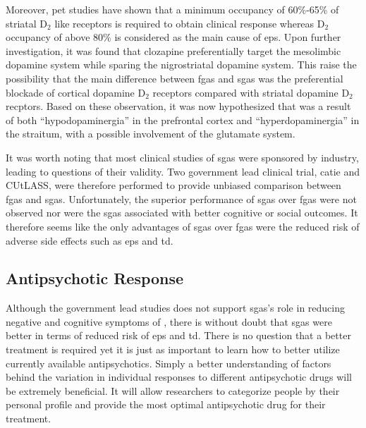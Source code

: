 	Moreover, \gls{pet} studies have shown that a minimum occupancy of 60\%-65\% of striatal D$_2$ like receptors is required to obtain clinical response whereas D$_2$ occupancy of above 80\% is considered as the main cause of \gls{eps}\citep{Arranz2007,Kapur2003}.
	Upon further investigation, it was found that clozapine preferentially target the mesolimbic dopamine system while sparing the nigrostriatal dopamine system\citep{Gardner1993}.
	This raise the possibility that the main difference between \glspl{fga} and \glspl{sga} was the preferential blockade of cortical dopamine D$_2$ receptors compared with striatal dopamine D$_2$ recptors\citep{Kapur2003}.
	Based on these observation, it was now hypothesized that  was a result of both ``hypodopaminergia'' in the prefrontal cortex and ``hyperdopaminergia'' in the straitum, with a possible involvement of the glutamate system\citep{Howes2009}.
	
	It was worth noting that most clinical studies of \glspl{sga} were sponsored by industry, leading to questions of their validity. 
	Two government lead clinical trial, \gls{catie}\citep{Lieberman2005} and CUtLASS\citep{Jones2006}, were therefore performed to provide unbiased comparison between \glspl{fga} and \glspl{sga}.
	Unfortunately, the superior performance of \glspl{sga} over \glspl{fga} were not observed nor were the \glspl{sga} associated with better cognitive or social outcomes.
	It therefore seems like the only advantages of \glspl{sga} over \glspl{fga} were the reduced risk of adverse side effects such as \gls{eps} and \gls{td}.
	
	\subsection{Antipsychotic Response}
	Although the government lead studies does not support \glspl{sga}'s role in reducing negative and cognitive symptoms of , there is without doubt that \glspl{sga} were better in terms of reduced risk of \gls{eps} and \gls{td}. 
	There is no question that a better treatment is required yet it is just as important to learn how to better utilize currently available antipsychotics. 
	Simply a better understanding of factors behind the variation in individual responses to different antipsychotic drugs will be extremely beneficial. 
	It will allow researchers to categorize people by their personal profile and provide the most optimal antipsychotic drug for their treatment. 
	
